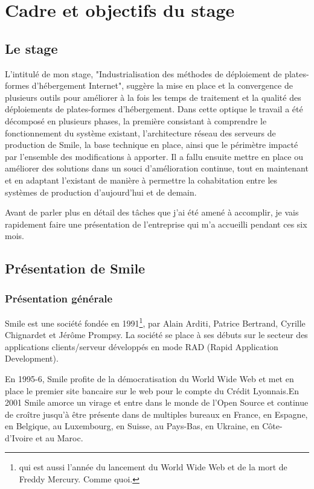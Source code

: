 \documentclass[14 pt,a4paper]{extreport}
\begin{document}
\section{Cadre et objectifs du stage}

\subsection{Le stage}L'intitulé de mon stage, "Industrialisation des méthodes de déploiement de plates-formes d'hébergement Internet", suggère la mise en place et la convergence de plusieurs outils pour améliorer à la fois les temps de traitement et la qualité des déploiements de plates-formes d'hébergement. Dans cette optique le travail a été décomposé en plusieurs phases, la première consistant à comprendre le fonctionnement du système existant, l'architecture réseau des serveurs de production de Smile, la base technique en place, ainsi que le périmètre impacté par l'ensemble des modifications à apporter. Il a fallu ensuite mettre en place ou améliorer des solutions dans un souci d'amélioration continue, tout en maintenant et en adaptant l'existant de manière à permettre la cohabitation entre les systèmes de production d'aujourd'hui et de demain.

Avant de parler plus en détail des tâches que j'ai été amené à accomplir, je vais rapidement faire une présentation de l'entreprise qui m'a accueilli pendant ces six mois.

\subsection{Présentation de Smile}

\subsubsection{Présentation générale}
Smile est une société fondée en 1991\footnote{qui est aussi l'année du lancement du World Wide Web et de la mort de Freddy Mercury. Comme quoi.}, par Alain Arditi, Patrice Bertrand, Cyrille Chignardet et Jérôme Prompsy. La société se place à ses débuts sur le secteur des applications clients/serveur développés en mode RAD (Rapid Application Development).

En 1995-6, Smile profite de la démocratisation du World Wide Web et met en place le premier site bancaire sur le web pour le compte du Crédit Lyonnais.En 2001 Smile amorce un virage et entre dans le monde de l'Open Source et continue de croître jusqu'à être présente dans de multiples bureaux en France, en Espagne, en Belgique, au Luxembourg, en Suisse, au Pays-Bas, en Ukraine, en Côte-d'Ivoire et au Maroc.
\end{document}
